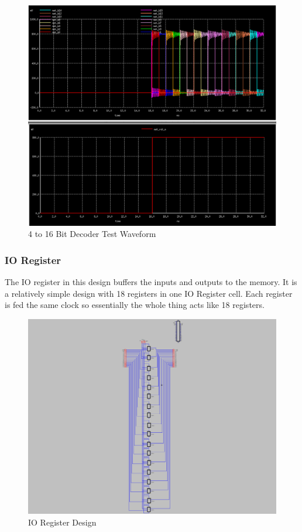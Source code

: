 \documentclass[a4paper]{article}
\begin{document}
\begin{figure}[H]
	\centering
	\includegraphics[scale=0.3]{decoderTestWithResetWaveform}
	\caption{4 to 16 Bit Decoder Test Waveform}
	\label{fig:decoderTestWithResetWaveform}
\end{figure}

\subsubsection{IO Register}
\label{sec:io_register_design}

The IO register in this design buffers the inputs and outputs to the memory. It is a relatively simple design with 18 registers in one IO Register cell. Each register is fed the same clock so essentially the whole thing acts like 18 registers.

\begin{figure}[H]
	\centering
	\includegraphics[scale=0.3]{ioRegister}
	\caption{IO Register Design}
	\label{fig:ioRegister}
\end{figure}
\end{document}
